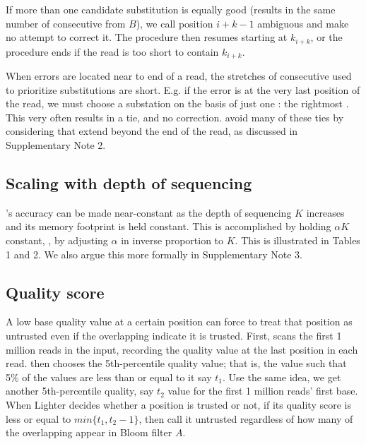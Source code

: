 \documentclass{bmcart}
\begin{document}
If more than one candidate substitution is equally good (\thatis results in the same number of consecutive \kmers from $B$), we call position $i+k-1$ ambiguous and make no attempt to correct it.
The procedure then resumes starting at $k_{i+k}$, or the procedure ends if the read is too short to contain \kmer $k_{i+k}$.



When errors are located near to end of a read, the stretches of consecutive \kmers used to prioritize substitutions are short.  E.g. if the error is at the very last position of the read, we must choose a substation on the basis of just one \kmer: the rightmost \kmer.  This very often results in a tie, and no correction.  \tool avoid many of these ties by considering \kmers that extend beyond the end of the read, as discussed in Supplementary Note 2.

\subsection*{Scaling with depth of sequencing}
\tool's accuracy can be made near-constant as the depth of sequencing $K$ increases and its memory footprint is held constant.  This is accomplished by holding $\alpha K$ constant, \thatis, by adjusting $\alpha$ in inverse proportion to $K$.  This is illustrated in Tables 1 and 2.  We also argue this more formally in Supplementary Note 3.

\subsection*{Quality score}
A low base quality value at a certain position can force \tool to treat that position as untrusted even if the overlapping \kmers indicate it is trusted.  First, \tool scans the first 1 million reads in the input, recording the quality value at the last position in each read.  \tool then chooses the 5th-percentile quality value; that is, the value such that 5\% of the values are less than or equal to it say $t_1$. Use the same idea, we get another 5th-percentile quality, say $t_2$ value for the first 1 million reads' first base. When Lighter decides whether a position is trusted or not, if its quality score is less or equal to $min\{t_1, t_2 - 1\}$, then call it untrusted regardless of how many of the overlapping \kmers appear in Bloom filter $A$. 
\end{document}
